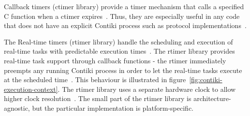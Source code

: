 Callback timers (ctimer library) provide a timer mechanism that calls a specified
C function when a ctimer expires~\cite{contiki-docs}.
Thus, they are especially useful in any code that does not have an
explicit Contiki process such as protocol implementations~\cite{contiki-wiki-timers}.

The Real-time timers (rtimer library) handle the scheduling and execution of
real-time tasks with predictable execution times~\cite{contiki-docs}.
The rtimer library provides real-time task support through callback functions -
the rtimer immediately preempts any running Contiki process in order to let the real-time tasks
execute at the scheduled time~\cite{contiki-wiki-timers}.
This behaviour is illustrated in figure~\ref{fig:contiki-execution-context}.
The rtimer library uses a separate hardware clock
to allow higher clock resolution~\cite{contiki-wiki-timers}.
The small part of the rtimer library is architecture-agnostic,
but the particular implementation is platform-specific.
